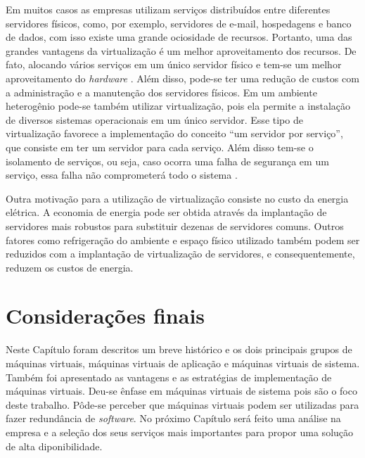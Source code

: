 Em muitos casos as empresas utilizam serviços distribuídos entre diferentes servidores físicos, como, por exemplo, servidores de e-mail, 
hospedagens e banco de dados, com isso existe uma grande ociosidade de recursos. Portanto, uma das grandes vantagens da virtualização é um melhor 
aproveitamento dos recursos. De fato, alocando vários serviços em um único servidor físico e tem-se um melhor aproveitamento do \textit{hardware} 
\cite{moreira2006}. Além disso, pode-se ter uma redução de custos com a administração e a manutenção dos servidores físicos. Em um ambiente 
heterogênio pode-se também utilizar virtualização, pois ela permite a instalação de diversos sistemas operacionais em um único servidor.
Esse tipo de virtualização favorece a implementação do conceito ``um servidor por serviço'', que consiste em ter um servidor para cada 
serviço. Além disso tem-se o isolamento de serviços, ou seja, caso ocorra uma falha de segurança em um serviço, essa falha não comprometerá 
todo o sistema \cite{carissimi2008}.

Outra motivação para a utilização de virtualização consiste no custo da energia elétrica. A economia de energia pode ser obtida 
através da implantação de servidores mais robustos para substituir dezenas de servidores comuns. Outros fatores como refrigeração do ambiente e 
espaço físico utilizado também podem ser reduzidos com a implantação de virtualização de servidores, e consequentemente, reduzem os 
custos de energia.

\section{Considerações finais}

Neste Capítulo foram descritos um breve histórico e os dois principais grupos de máquinas virtuais, máquinas virtuais de aplicação e máquinas 
virtuais de sistema. Também foi apresentado as vantagens e as estratégias de implementação de máquinas virtuais. Deu-se ênfase em máquinas 
virtuais de sistema pois são o foco deste trabalho. Pôde-se perceber que máquinas virtuais podem ser utilizadas para fazer redundância de 
\textit{software}. No próximo Capítulo será feito uma análise na empresa e a seleção dos seus serviços mais importantes para propor uma 
solução de alta diponibilidade.



